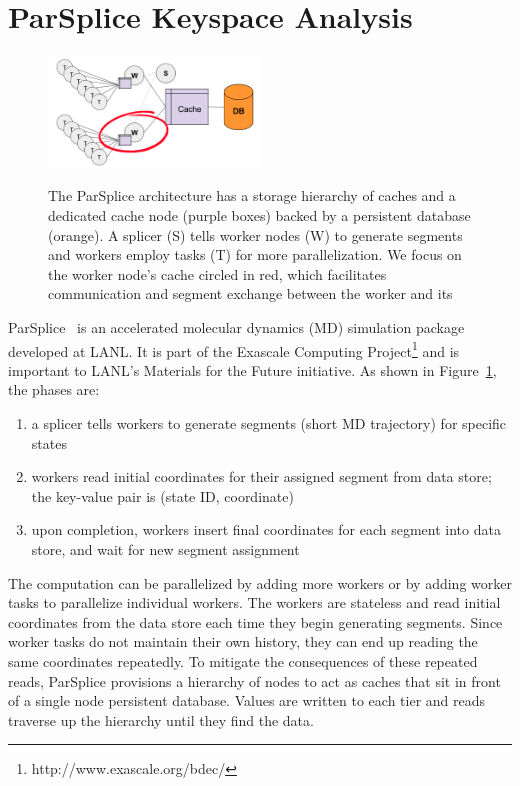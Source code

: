 \section{ParSplice Keyspace Analysis}
\label{sec:parsplice-keyspace-analysis}

\begin{figure}[t]
\noindent\includegraphics[width=0.5\textwidth]{figures/parsplice.png}\\
\caption{The ParSplice architecture has a storage hierarchy of caches and a
dedicated cache node (purple boxes) backed by a persistent database (orange). A
splicer (S) tells worker nodes (W) to generate segments and workers employ
tasks (T) for more parallelization. We focus on the worker node's cache circled
in red, which facilitates communication and segment exchange between the worker
and its \label{fig:parsplice}} \end{figure}

ParSplice~\cite{perez:jctc20150parsplice} is an accelerated molecular dynamics
(MD) simulation package developed at LANL. It is part of the Exascale Computing
Project\footnote{http://www.exascale.org/bdec/} and is important to LANL's
Materials for the Future initiative. As shown in Figure~\ref{fig:parsplice},
the phases are:

\begin{enumerate}

  \item a splicer tells workers to generate segments (short MD trajectory) for
  specific states

  \item workers read initial coordinates for their assigned segment from data
  store; the key-value pair is (state ID, coordinate)

  \item upon completion, workers insert final coordinates for each segment into
  data store, and wait for new segment assignment

\end{enumerate}

The computation can be parallelized by adding more workers or by adding worker
tasks to parallelize individual workers.  The workers are stateless and read
initial coordinates from the data store each time they begin generating
segments. Since worker tasks do not maintain their own history, they can end up
reading the same coordinates repeatedly. To mitigate the consequences of these
repeated reads, ParSplice provisions a hierarchy of nodes to act as caches that
sit in front of a single node persistent database.  Values are written to each
tier and reads traverse up the hierarchy until they find the data. 

